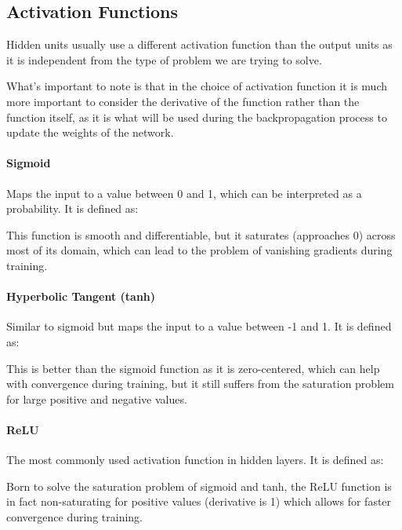 \subsection{Activation Functions}
Hidden units usually use a different activation function than the output units as it is independent from the type of problem we are trying to solve.

What's important to note is that in the choice of activation function it is much more important to 
consider the derivative of the function rather than the function itself, as it is what will be 
used during the backpropagation process to update the weights of the network.
\paragraph{Sigmoid}
Maps the input to a value between 0 and 1, which can be interpreted as a probability. It is defined as:
\begin{figure}[H]
    \centering
    
\end{figure}
This function is smooth and differentiable, but it saturates (approaches 0) across most of its domain,
which can lead to the problem of vanishing gradients during training.

\paragraph{Hyperbolic Tangent (tanh)}
Similar to sigmoid but maps the input to a value between -1 and 1. It is defined as:
\begin{figure}[H]
    \centering
    
\end{figure}
This is better than the sigmoid function as it is zero-centered, which can help with convergence during training,
but it still suffers from the saturation problem for large positive and negative values.

\paragraph{ReLU}
The most commonly used activation function in hidden layers. It is defined as:
\begin{figure}[H]
    \centering
    
\end{figure}
Born to solve the saturation problem of sigmoid and tanh, the ReLU function is in fact non-saturating for positive values (derivative is 1) which allows for faster convergence during training.

